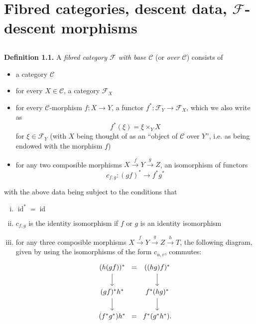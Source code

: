 \documentclass{article}
\newenvironment{rmenv}[1]
  {\phantomsection\par\medskip\noindent\textbf{#1.}\rmfamily}
  {\par\medskip}
\renewcommand{\cal}[1]{{\mathcal{#1}}}
\DeclareMathOperator{\id}{id}
\begin{document}
\section{Fibred categories, descent data, \texorpdfstring{$\cal{F}$}{F}-descent morphisms}
\label{A.1}

\subsection{}
\label{A.1.a}

\begin{rmenv}{Definition 1.1}
\label{definition:A.1.1}
  A \emph{fibred category $\cal{F}$ with base $\cal{C}$} (or \emph{over $\cal{C}$}) consists of
  \begin{itemize}
    \item a category $\cal{C}$
    \item for every $X\in\cal{C}$, a category $\cal{F}_X$
    \item for every $\cal{C}$-morphism $f\colon X\to Y$, a functor $f^*\colon\cal{F}_Y\to\cal{F}_X$, which we also write as
      \[
        f^*(\xi) = \xi \times_Y X
      \]
      for $\xi\in\cal{F}_Y$ (with $X$ being thought of as an ``object of $\cal{C}$ over $Y$'', i.e. as being endowed with the morphism $f$)
    \item for any two composible morphisms $X\xrightarrow{f}Y\xrightarrow{g}Z$, an isomorphism of functors
      \[
        c_{f,g}\colon (gf)^* \to f^*g^*
      \]
  \end{itemize}
  with the above data being subject to the conditions that
  \begin{enumerate}[(i)]
    \item $\id^*=\id$
    \item $c_{f,g}$ is the identity isomorphism if $f$ or $g$ is an identity isomorphism
    \item for any three composible morphisms $X\xrightarrow{f}Y\xrightarrow{g}Z\xrightarrow{h}T$, the following diagram, given by using the isomorphisms of the form $c_{u,v}$, commutes:
      \[
        \begin{tikzcd}[column sep=0]
          (h(gf))^* \dar &=& ((hg)f)^* \dar
        \\(gf)^*h^* \dar && f^*(hg)^* \dar
        \\(f^*g^*)h^* &=& f^*(g^*h^*).
        \end{tikzcd}
      \]
  \end{enumerate}
\end{rmenv}
\end{document}
